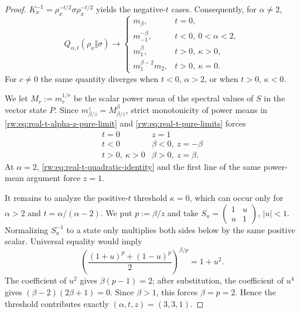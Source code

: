 \documentclass[11pt]{article}
\theoremstyle{remark}
\newcommand{\1}{\mathbbm{1}}
\begin{document}
\begin{proof}
$K_x^{-1}=\rho_x^{-t/2}\sigma\rho_x^{-t/2}$ yields the negative-$t$
cases.  Consequently, for $\alpha\neq2$,
\begin{equation}
 Q_{\alpha,t}(\rho_x\Vert\sigma)\longrightarrow
 \begin{cases}
  m_\beta,&t=0,\\[1mm]
  m_{-1}^{-\beta},&t<0,\ 0<\alpha<2,\\[1mm]
  m_1^\beta,&t>0,\ \kappa>0,\\[1mm]
  m_1^{\beta-2}m_2,&t>0,\ \kappa=0.
 \end{cases}
 \label{rw:eq:real-t-pure-limits}
\end{equation}
For $c\neq0$ the same quantity diverges when $t<0$, $\alpha>2$,
or when $t>0$, $\kappa<0$.

We let $M_r:=m_r^{1/r}$ be the scalar power mean of the spectral values
of $S$ in the vector state $P$.  Since
$m_{\beta/z}^z=M_{\beta/z}^{\beta}$, strict monotonicity of power
means in \eqref{rw:eq:real-t-alpha-z-pure-limit} and \eqref{rw:eq:real-t-pure-limits}
forces
\begin{equation}
 \begin{array}{c|c}
  t=0&z=1\\
  t<0&\beta<0,\ z=-\beta\\
  t>0,\ \kappa>0&\beta>0,\ z=\beta.
 \end{array}
 \label{rw:eq:real-t-power-mean-candidates}
\end{equation}
At $\alpha=2$, \eqref{rw:eq:real-t-quadratic-identity} and the first
line of the same power-mean argument force $z=1$.

It remains to analyze the positive-$t$ threshold $\kappa=0$, which
can occur only for $\alpha>2$ and
$t=\alpha/(\alpha-2)$.  We put $p:=\beta/z$ and take
$S_u=\left(\begin{smallmatrix}1&u\\u&1\end{smallmatrix}\right)$,
$\lvert u\rvert<1$.  Normalizing $S_u^{-1}$ to a state only
multiplies both sides below by the same positive scalar.  Universal
equality would imply
\begin{equation}
 \left(
  \frac{(1+u)^p+(1-u)^p}{2}
 \right)^{\beta/p}=1+u^2.
 \label{rw:eq:real-t-threshold-identity}
\end{equation}
The coefficient of $u^2$ gives $\beta(p-1)=2$; after substitution,
the coefficient of $u^4$ gives
$(\beta-2)(2\beta+1)=0$.  Since $\beta>1$, this forces
$\beta=p=2$.  Hence the threshold contributes exactly
$(\alpha,t,z)=(3,3,1)$.


\end{proof}
\end{document}
